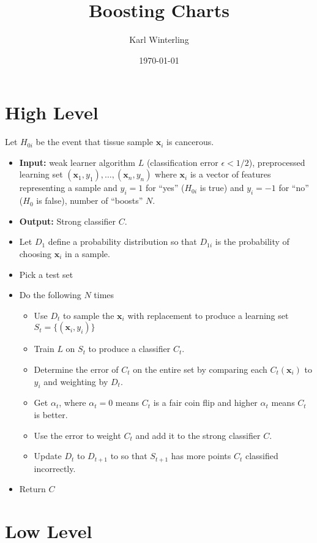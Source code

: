\documentclass[12pt]{article}
\title{Boosting Charts}
\author{Karl Winterling}
\date{\today}
\newcommand{\vct}[1]{\ensuremath{\mathbf{#1}}}
\begin{document}
\maketitle

\section*{High Level}

Let $H_{0i}$ be the event that tissue sample $\mathbf{x}_i$ is cancerous.

\begin{itemize}
\item \textbf{Input:} weak learner algorithm $L$ (classification error $\epsilon < 1/2$), preprocessed learning set $(\mathbf{x}_1, y_1), \ldots, (\mathbf{x}_n, y_n)$ where $\mathbf{x}_i$ is a vector of features representing a sample and $y_i = 1$ for ``yes'' ($H_{0 i}$ is true) and $y_i = -1$ for ``no'' ($H_0$ is false), number of ``boosts'' $N$. 
\item \textbf{Output:} Strong classifier $C$.
\item Let $D_1$ define a probability distribution so that $D_{1i}$ is the probability of choosing $\mathbf{x}_i$ in a sample.
\item Pick a test set
\item Do the following $N$ times
\begin{itemize}
\item Use $D_t$ to sample the $\vct{x}_i$ with replacement to produce a learning set $S_t = \{(\mathbf{x}_i, y_i)\}$
\item Train $L$ on $S_t$ to produce a classifier $C_t$.
\item Determine the error of $C_t$ on the entire set by comparing each $C_t (\vct{x}_i)$ to $y_i$ and weighting by $D_t$.
\item Get $\alpha_t$, where $\alpha_t = 0$ means $C_t$ is a fair coin flip and higher $\alpha_t$ means $C_t$ is better.
\item Use the error to weight $C_t$ and add it to the strong classifier $C$.
\item Update $D_t$ to $D_{t + 1}$ to so that $S_{t + 1}$ has more points $C_t$ classified incorrectly.
\end{itemize}
\item Return $C$
\end{itemize}

\section*{Low Level}
\end{document}
